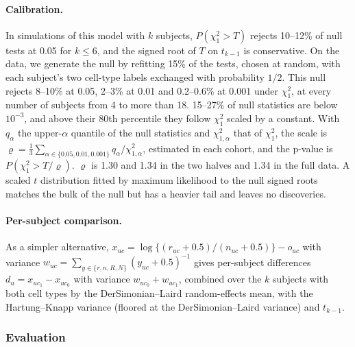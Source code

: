 \documentclass[11pt]{article}
\begin{document}
\paragraph{Calibration.} In simulations of this model with $k$ subjects, $P(\chi^2_1>T)$ rejects 10--12\% of null tests at 0.05 for $k\le6$, and the signed root of $T$ on $t_{k-1}$ is conservative. On the data, we generate the null by refitting 15\% of the tests, chosen at random, with each subject's two cell-type labels exchanged with probability $1/2$. This null rejects 8--10\% at 0.05, 2--3\% at 0.01 and 0.2--0.6\% at 0.001 under $\chi^2_1$, at every number of subjects from 4 to more than 18. 15--27\% of null statistics are below $10^{-3}$, and above their 80th percentile they follow $\chi^2_1$ scaled by a constant. With $q_\alpha$ the upper-$\alpha$ quantile of the null statistics and $\chi^2_{1,\alpha}$ that of $\chi^2_1$, the scale is $\varrho=\frac13\sum_{\alpha\in\{0.05,0.01,0.001\}}q_\alpha/\chi^2_{1,\alpha}$, estimated in each cohort, and the p-value is $P(\chi^2_1>T/\varrho)$. $\varrho$ is 1.30 and 1.34 in the two halves and 1.34 in the full data. A scaled $t$ distribution fitted by maximum likelihood to the null signed roots matches the bulk of the null but has a heavier tail and leaves no discoveries.

\paragraph{Per-subject comparison.} As a simpler alternative, $x_{uc}=\log\{(r_{uc}+0.5)/(n_{uc}+0.5)\}-o_{uc}$ with variance $w_{uc}=\sum_{y\in\{r,n,R,N\}}(y_{uc}+0.5)^{-1}$ gives per-subject differences $d_u=x_{uc_1}-x_{uc_0}$ with variance $w_{uc_0}+w_{uc_1}$, combined over the $k$ subjects with both cell types by the DerSimonian--Laird random-effects mean, with the Hartung--Knapp variance (floored at the DerSimonian--Laird variance) and $t_{k-1}$.

\subsubsection{Evaluation}
\end{document}
